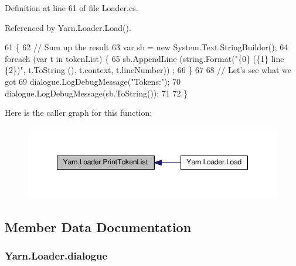 Definition at line 61 of file Loader.\-cs.



Referenced by Yarn.\-Loader.\-Load().


\begin{DoxyCode}
61                                                           \{
62             \textcolor{comment}{// Sum up the result}
63             var sb = \textcolor{keyword}{new} System.Text.StringBuilder();
64             \textcolor{keywordflow}{foreach} (var t \textcolor{keywordflow}{in} tokenList) \{
65                 sb.AppendLine (string.Format(\textcolor{stringliteral}{"\{0\} (\{1\} line \{2\})"}, t.ToString (), t.context, t.lineNumber))
      ;
66             \}
67 
68             \textcolor{comment}{// Let's see what we got}
69             dialogue.LogDebugMessage(\textcolor{stringliteral}{"Tokens:"});
70             dialogue.LogDebugMessage(sb.ToString());
71 
72         \}
\end{DoxyCode}


Here is the caller graph for this function\-:
\nopagebreak
\begin{figure}[H]
\begin{center}
\leavevmode
\includegraphics[width=346pt]{a00123_a9321fce224021841ce6f70ca7fbe531b_icgraph}
\end{center}
\end{figure}




\subsection{Member Data Documentation}
\hypertarget{a00123_a89d1f29eba1c52c96c62a4cfe7859a1d}{
\subsubsection[{dialogue}]{ Yarn.\-Loader.\-dialogue\hspace{0.3cm}{\ttfamily [private]}}}\label{a00123_a89d1f29eba1c52c96c62a4cfe7859a1d}


